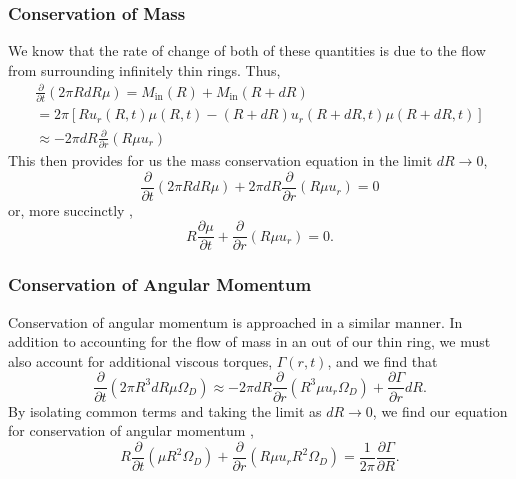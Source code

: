 \documentclass[aps,pra,twocolumn]{revtex4-1}
\begin{document}
\subsubsection{\label{section 2.1.1} Conservation of Mass}
We know that the rate of change of both of these quantities is due to the flow from surrounding infinitely thin rings.  Thus,
\begin{multline}
\frac{\partial}{\partial t}\left(  2\pi R dR \mu \right) = M_{\text{in}}(R) + M_{\text{in}}(R + dR) \\
= 2\pi \left[ R u_r(R, t) \mu(R, t) - (R + dR) u_r(R+dR, t) \mu(R+dR, t)\right] \\
\approx -2\pi dR \frac{\partial}{\partial r}(R\mu u_r)
\nonumber
\end{multline}
This then provides for us the mass conservation equation in the limit $dR \rightarrow 0$,
\begin{equation}
\frac{\partial}{\partial t}\left(  2\pi R dR \mu \right) + 2\pi dR \frac{\partial}{\partial r}(R\mu u_r) = 0 \nonumber
\end{equation}
or, more succinctly \cite{king2002},
\begin{equation}
R \frac{\partial \mu}{\partial t} + \frac{\partial}{\partial r}(R \mu u_r) = 0. \label{consMass}
\end{equation}

\subsubsection{\label{section 2.1.2} Conservation of Angular Momentum}
Conservation of angular momentum is approached in a similar manner. In addition to accounting for the flow of mass in an out of our thin ring, we must also account for additional viscous torques, $\Gamma(r, t)$, and we find that
\begin{equation}
\frac{\partial}{\partial t}\left(  2\pi R^3 dR \mu \Omega_D \right) \approx  -2\pi dR \frac{\partial}{\partial r}(R^3 \mu u_r \Omega_D) + \frac{\partial \Gamma}{\partial r}dR.
\nonumber
\end{equation}
By isolating common terms and taking the limit as $dR \rightarrow 0$, we find our equation for conservation of angular momentum \cite{king2002},
\begin{equation}
R \frac{\partial}{\partial t} (\mu R^2 \Omega_D) + \frac{\partial}{\partial r} (R \mu u_r R^2 \Omega_D ) = \frac{1}{2\pi} \frac{\partial \Gamma}{\partial R}. \label{consAng}
\end{equation}
\end{document}
